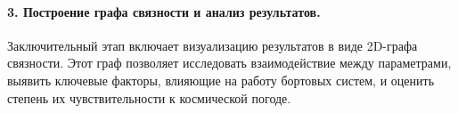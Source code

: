 \documentclass[14pt, a4paper]{src/bsu}
\begin{document}
\paragraph*{3. Построение графа связности и анализ результатов.}
Заключительный этап включает визуализацию результатов в виде 2D-графа
связности. Этот граф позволяет исследовать взаимодействие между
параметрами, выявить ключевые факторы, влияющие на работу бортовых
систем, и оценить степень их чувствительности к космической погоде.

\end{document}
